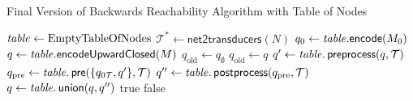 \begin{algorithm}[htb]
\caption{Final Version of Backwards Reachability Algorithm with Table of Nodes}\label{alg:bw_wwa_final}
\begin{algorithmic}[1]
\State $\mathit{table} \gets \text{EmptyTableOfNodes}$
\color{blue!75}
\State $\mathcal{T}^{*} \gets \textsf{net2transducers}(N)$
\color{black}
\State $q_{0} \gets  \mathit{table}.\textsf{encode}(M_{0})$
\State $q \gets \mathit{table}.\textsf{encodeUpwardClosed}(M)$
\State $q_{\text{old}} \gets q_{\emptyset}$
	\State $q_{\text{old}}  \gets q$
	\color{blue!75}
\State $q' \gets \mathit{table}.\operatorname{\textsf{preprocess}}(q,\mathcal{T})$
	\State $q_{\text{pre}} \gets \mathit{table}.\operatorname{\textsf{pre}}(\{q_{0\mathcal{T}},q'\},\mathcal{T})$
	\State $q'' \gets \mathit{table}.\operatorname{\textsf{postprocess}}(q_{\text{pre}},\mathcal{T})$
	\State $q \gets \mathit{table}.\operatorname{\textsf{union}}(q, q'')$
	\EndFor
	\color{black}
	\Return true
\EndIf
{}
    \Return false
\EndIf
\EndWhile
\end{algorithmic}
\end{algorithm}


